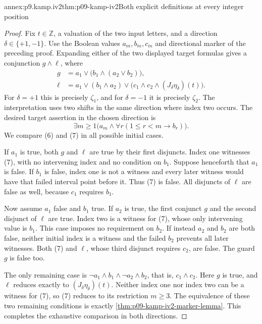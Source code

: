 \begin{annexitem}{annex:p9.kamp.iv2}{thm:p09-kamp-iv2}{Both explicit definitions at every integer position}
\begin{proof}
Fix \(t\in\mathbb Z\), a valuation of the two input
letters, and a direction \(\delta\in\{+1,-1\}\).
Use the Boolean values \(a_m,b_m,c_m\) and directional
marker of the preceding proof. Expanding either of the
two displayed target formulas gives a conjunction
\(g\land \ell\), where
\[
\begin{aligned}
 g&=a_1\lor\bigl(b_1\land(a_2\lor b_2)\bigr),\\
 \ell&=a_1\lor(b_1\land a_2)\lor
              \bigl(c_1\land c_2\land
                    (J_\delta\eta_\delta)(t)\bigr).
\end{aligned}
 \tag{6}
\]
For \(\delta=+1\) this is precisely \(\zeta_1\),
and for \(\delta=-1\) it is precisely \(\zeta_2\).
The interpretation uses two shifts in the same direction
where index two occurs. The desired target assertion in
the chosen direction is
\[
 \exists m\geq1\bigl(a_m\land
                  \forall r(1\leq r<m\to b_r)\bigr).
 \tag{7}
\]
We compare (6) and (7) in all possible initial cases.

If \(a_1\) is true, both \(g\) and \(\ell\) are
true by their first disjuncts. Index one witnesses (7),
with no intervening index and no condition on \(b_1\).
Suppose henceforth that \(a_1\) is false. If \(b_1\)
is false, index one is not a witness and every later
witness would have that failed interval point before it.
Thus (7) is false. All disjuncts of \(\ell\) are
false as well, because \(c_1\) requires \(b_1\).

Now assume \(a_1\) false and \(b_1\) true. If
\(a_2\) is true, the first conjunct \(g\) and the
second disjunct of \(\ell\) are true. Index two is
a witness for (7), whose only intervening value is
\(b_1\). This case imposes no requirement on \(b_2\).
If instead \(a_2\) and \(b_2\) are both false,
neither initial index is a witness and the failed
\(b_2\) prevents all later witnesses. Both (7) and
\(\ell\), whose third disjunct requires \(c_2\),
are false. The guard \(g\) is false too.

The only remaining case is
\(\neg a_1\land b_1\land\neg a_2\land b_2\),
that is, \(c_1\land c_2\). Here \(g\) is true,
and \(\ell\) reduces exactly to
\((J_\delta\eta_\delta)(t)\). Neither index one
nor index two can be a witness for (7), so (7) reduces
to its restriction \(m\geq3\). The equivalence of
these two remaining conditions is exactly
\cref{thm:p09-kamp-iv2-marker-lemma}. This completes
the exhaustive comparison in both directions.


\end{proof}
\end{annexitem}

